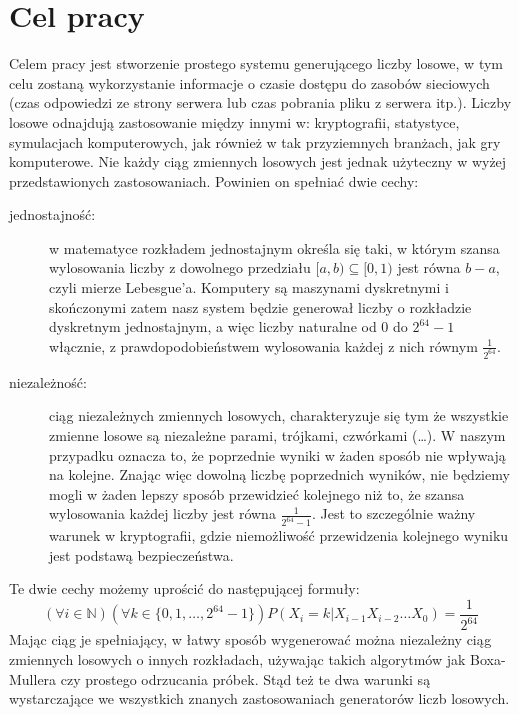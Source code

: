 \chapter{Cel pracy}
\thispagestyle{chapterBeginStyle}

Celem pracy jest stworzenie prostego systemu generującego liczby losowe, w tym celu zostaną wykorzystanie informacje o czasie dostępu do zasobów sieciowych (czas odpowiedzi ze strony serwera lub czas pobrania pliku z serwera itp.). Liczby losowe odnajdują zastosowanie między innymi w: kryptografii, statystyce, symulacjach komputerowych, jak również w tak przyziemnych branżach, jak gry komputerowe. Nie każdy ciąg zmiennych losowych jest jednak użyteczny w wyżej przedstawionych zastosowaniach. Powinien on spełniać dwie cechy:
\begin{description}
\item[jednostajność:] w matematyce rozkładem jednostajnym określa się taki, w którym szansa wylosowania liczby z dowolnego przedziału $[a, b)  \subseteq [0, 1)$ jest równa $b-a$, czyli mierze Lebesgue’a. Komputery są maszynami dyskretnymi i skończonymi zatem nasz system będzie generował liczby o rozkładzie dyskretnym jednostajnym, a więc liczby naturalne od 0 do $2^{64}-1$ włącznie, z prawdopodobieństwem wylosowania każdej z nich równym $\frac{1}{2^{64}}$.
\item[niezależność:] ciąg niezależnych zmiennych losowych, charakteryzuje się tym że wszystkie zmienne losowe są niezależne parami, trójkami, czwórkami (\dots). W naszym przypadku oznacza to, że poprzednie wyniki w żaden sposób nie wpływają na kolejne. Znając więc dowolną liczbę poprzednich wyników, nie będziemy mogli w żaden lepszy sposób przewidzieć kolejnego niż to, że szansa wylosowania  każdej liczby jest równa $\frac{1}{2^{64}-1}$. Jest to szczególnie ważny warunek w kryptografii, gdzie niemożliwość przewidzenia kolejnego wyniku jest podstawą bezpieczeństwa. 
\end{description}
Te dwie cechy możemy uprościć do następującej formuły:
\begin{equation}
    \label{eg:target_def}
    (\forall i \in \mathbb{N})(\forall k \in \{0, 1, \dots, 2^{64}-1\}) P(X_i=k|X_{i-1}X_{i-2}\dots X_{0}) = \frac{1}{2^{64}}
\end{equation}
Mając ciąg je spełniający, w łatwy sposób wygenerować można niezależny ciąg zmiennych losowych o innych rozkładach, używając takich algorytmów jak Boxa-Mullera czy prostego odrzucania próbek. Stąd też te dwa warunki są wystarczające we wszystkich znanych zastosowaniach generatorów liczb losowych.
